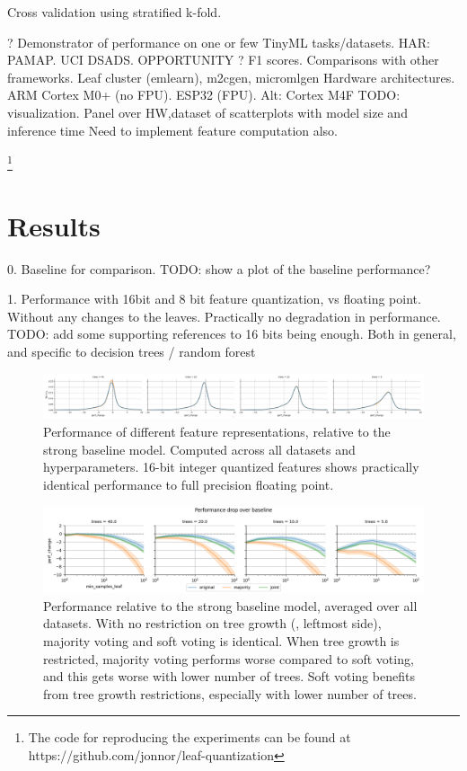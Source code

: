 \documentclass{article}
\begin{document}
Cross validation using stratified k-fold.

? Demonstrator of performance on one or few TinyML tasks/datasets.
HAR: PAMAP. UCI DSADS. OPPORTUNITY ? F1 scores. 
Comparisons with other frameworks. Leaf cluster (emlearn), m2cgen, micromlgen
Hardware architectures. ARM Cortex M0+ (no FPU). ESP32 (FPU). Alt: Cortex M4F
TODO: visualization. Panel over HW,dataset of scatterplots with model size and inference time
Need to implement feature computation also.

\footnote{The code for reproducing the experiments can be found at https://github.com/jonnor/leaf-quantization}

\newpage
\section{Results}

0. Baseline for comparison.
TODO: show a plot of the baseline performance?

1. Performance with 16bit and 8 bit feature quantization, vs floating point.
Without any changes to the leaves.
Practically no degradation in performance.
TODO: add some supporting references to 16 bits being enough. Both in general, and specific to decision trees / random forest

\begin{figure}[h!]
\begin{center}
  \includegraphics[width=0.98\linewidth]{reports/figures/int16-vs-float.png}
  \end{center}
  \caption{ Performance of different feature representations, relative to the strong baseline model. Computed across all datasets and hyperparameters. 16-bit integer quantized features shows practically identical performance to full precision floating point. }
  \label{fig:int16_vs_float}
\end{figure}

\begin{figure}[h!]
\begin{center}
  \includegraphics[width=0.98\linewidth]{reports/figures/hyperparam-perfdrop-trees-strategies.png}
  \end{center}
  \caption{ Performance relative to the strong baseline model, averaged over all datasets. With no restriction on tree growth (, leftmost side), majority voting and soft voting is identical. When tree growth is restricted, majority voting performs worse compared to soft voting, and this gets worse with lower number of trees. Soft voting benefits from tree growth restrictions, especially with lower number of trees. }
  \label{fig:hyperparameter_strategies}
\end{figure}
\end{document}
